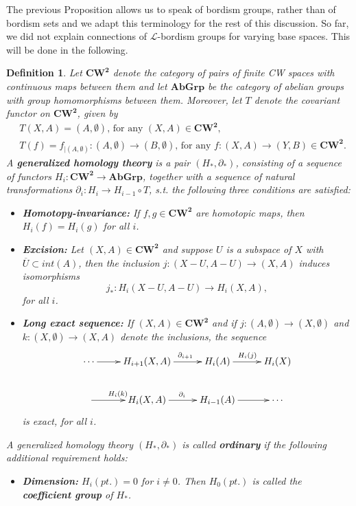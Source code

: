 \documentclass{scrreprt}
\newtheorem{definition}[prop]{Definition}
\begin{document}
The previous Proposition allows us to speak of bordism groups, rather than of bordism sets and we adapt this terminology for the rest of this discussion. \newline So far, we did not explain connections of $\mathcal{L}$-bordism groups for varying base spaces. This will be done in the following.

\begin{definition}
Let $\boldsymbol{CW^2}$ denote the category of pairs of finite CW spaces with continuous maps between them and let $\boldsymbol{AbGrp}$ be the category of abelian groups with group homomorphisms between them. Moreover, let $T$ denote the covariant functor on $\boldsymbol{CW^2}$, given by
\begin{align*}
&T(X,A) = (A, \emptyset) \text{, for any } (X,A) \in \boldsymbol{CW^2},  \\
&T(f) = f_{|(A, \emptyset)} : (A, \emptyset) \to (B, \emptyset) \text{, for any } f: (X,A) \to (Y,B) \in \boldsymbol{CW^2}.
\end{align*}
A \textbf{generalized homology theory} is a pair $(H_*, \partial_*)$, consisting of a sequence of functors $H_i : \boldsymbol{CW^2} \to \boldsymbol{AbGrp}$, together with a sequence of natural transformations $\partial_i : H_i \to H_{i-1} \circ T$, s.t. the following three conditions are satisfied: \begin{itemize}
\item[1.] \textbf{Homotopy-invariance:} If $f,g \in \boldsymbol{CW^2}$ are homotopic maps, then $H_i(f)=H_i(g)$ for all $i$.
\item[2.] \textbf{Excision:} Let $(X,A) \in \boldsymbol{CW^2}$ and suppose $U$ is a subspace of $X$ with $\overline{U} \subset int(A)$, then the inclusion $j: (X-U,A-U) \to (X,A)$ induces isomorphisms 
\begin{equation*}
j_* : H_i(X-U,A-U) \to H_i(X,A),
\end{equation*}
for all $i$.
\item[3.] \textbf{Long exact sequence:} If $(X,A) \in \boldsymbol{CW^2}$ and if $j: (A, \emptyset) \to (X, \emptyset)$ and $k: (X, \emptyset) \to (X,A)$ denote the inclusions, the sequence
\begin{equation*}
\begin{xy}
\xymatrix{ 
\cdots \ar[r]^{}     &   H_{i+1}(X,A) \ar[r]^{\ \ \partial_{i+1}}    &   H_i(A) \ar[r]^{H_i(j)}   &  H_i(X) \\
  \ar[r]^{H_i(k)}   &   H_i(X,A)  \ar[r]^{\partial_i}   &   H_{i-1}(A) \ar[r]^{}   &   \cdots
}
\end{xy}
\end{equation*}
is exact, for all $i$.
\end{itemize}
A generalized homology theory $(H_*, \partial_*)$ is called \textbf{ordinary} if the following additional requirement holds:
\begin{itemize}
\item[4.] \textbf{Dimension:} $H_i(pt.)=0$ for $i \neq 0$. Then $H_0(pt.)$ is called the \textbf{coefficient group} of $H_*$.
\end{itemize}
\end{definition}
\end{document}
